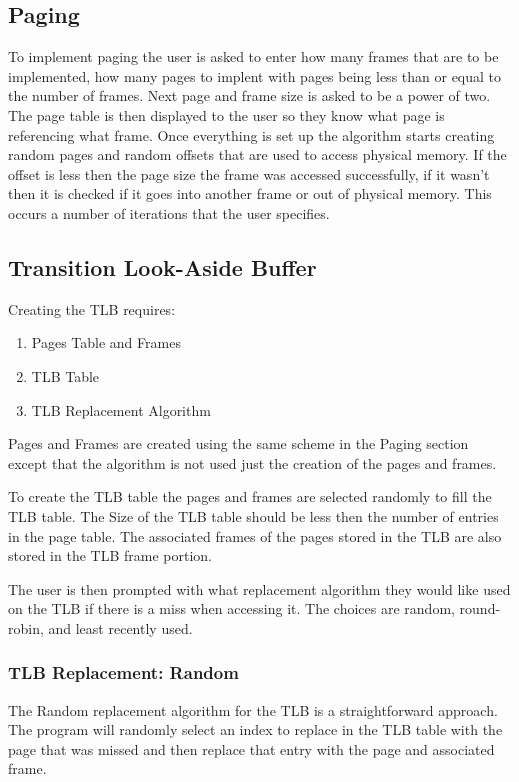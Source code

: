 \documentclass[11pt]{article}
\begin{document}
\begin{multicols}{2}
\subsection{Paging}
To implement paging the user is asked to enter how many frames that are to be implemented, how many pages to implent with pages being less than or equal to the number of frames. Next page and frame size is asked to be a power of two. The page table is then displayed to the user so they know what page is referencing what frame. Once everything is set up the algorithm starts creating random pages and random offsets that are used to access physical memory. If the offset is less then the page size the frame was accessed successfully, if it wasn't then it is checked if it goes into another frame or out of physical memory. This occurs a number of iterations that the user specifies.

\subsection{Transition Look-Aside Buffer}
Creating the TLB requires:
\begin{enumerate}
\item Pages Table and Frames
\item TLB Table
\item TLB Replacement Algorithm
\end{enumerate}

Pages and Frames are created using the same scheme in the Paging section except that the algorithm is not used just the creation of the pages and frames.

To create the TLB table the pages and frames are selected randomly to fill the TLB table. The Size of the TLB table should be less then the number of entries in the page table. The associated frames of the pages stored in the TLB are also stored in the TLB frame portion.

The user is then prompted with what replacement algorithm they would like used on the TLB if there is a miss when accessing it. The choices are random, round-robin, and least recently used.


\subsubsection{TLB Replacement: Random}
The Random replacement algorithm for the TLB is a straightforward approach. The program will randomly select an index to replace in the TLB table with the page that was missed and then replace that entry with the page and associated frame.


\end{multicols}
\end{document}

